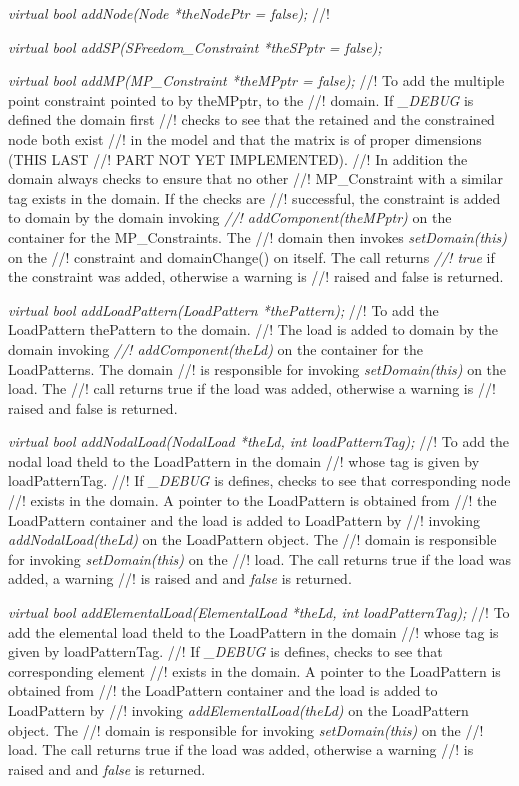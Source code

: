{\em virtual bool addNode(Node *theNodePtr = false);}  
//! 


{\em virtual bool addSP(SFreedom\_Constraint *theSPptr = false);}  




{\em virtual bool addMP(MP\_Constraint *theMPptr = false);}  
//! To add the multiple point constraint pointed to by theMPptr, to the
//! domain. If {\em \_DEBUG} is defined the domain first
//! checks to see that the retained and the constrained node both exist
//! in the model and that the matrix is of proper dimensions (THIS LAST
//! PART NOT YET IMPLEMENTED). 
//! In addition the domain always checks to ensure that no other
//! MP\_Constraint with a similar tag exists in the domain. If the checks are
//! successful, the constraint is added to domain by the domain invoking {\em
//! addComponent(theMPptr)} on the container for the MP\_Constraints. The
//! domain then invokes {\em setDomain(this)} on the 
//! constraint and domainChange() on itself. The call returns {\em
//! true} if the constraint was added, otherwise a warning is
//! raised and \p false is returned.


{\em virtual bool addLoadPattern(LoadPattern *thePattern);}   
//! To add the LoadPattern \p thePattern to the domain.
//! The load is added to domain by the domain invoking {\em
//! addComponent(theLd)} on the container for the LoadPatterns. The domain
//! is responsible for invoking {\em setDomain(this)} on the load. The
//! call returns \p true if the load was added, otherwise a warning is
//! raised and \p false is returned.

{\em virtual bool addNodalLoad(NodalLoad *theLd, int loadPatternTag);}   
//! To add the nodal load \p theld to the LoadPattern in the domain
//! whose tag is given by \p loadPatternTag.
//! If {\em \_DEBUG} is defines, checks to see that corresponding node
//! exists in the domain. A pointer to the LoadPattern is obtained from
//! the LoadPattern container and the load is added to LoadPattern by
//! invoking {\em addNodalLoad(theLd)} on the LoadPattern object. The
//! domain is responsible for invoking {\em setDomain(this)} on the
//! load. The call returns \p true if the load was added, a warning
//! is raised and and {\em false} is returned. 


{\em virtual bool addElementalLoad(ElementalLoad *theLd, int loadPatternTag);}   
//! To add the elemental load \p theld to the LoadPattern in the domain
//! whose tag is given by \p loadPatternTag.
//! If {\em \_DEBUG} is defines, checks to see that corresponding element
//! exists in the domain. A pointer to the LoadPattern is obtained from
//! the LoadPattern container and the load is added to LoadPattern by
//! invoking {\em addElementalLoad(theLd)} on the LoadPattern object. The
//! domain is responsible for invoking {\em setDomain(this)} on the
//! load. The call returns \p true if the load was added, otherwise a warning
//! is raised and and {\em false} is returned. 


